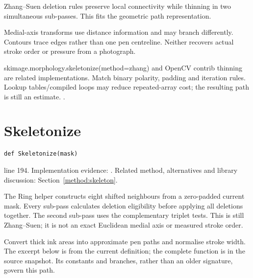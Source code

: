 Zhang--Suen deletion rules preserve local connectivity while thinning in two simultaneous sub-passes. This fits the geometric path representation.


Medial-axis transforms use distance information and may branch differently. Contours trace edges rather than one pen centreline. Neither recovers actual stroke order or pressure from a photograph.


skimage.morphology.skeletonize(method=zhang) and OpenCV contrib thinning are related implementations. Match binary polarity, padding and iteration rules. Lookup tables/compiled loops may reduce repeated-array cost; the resulting path is still an estimate. \cite{zhangsuen1984,skmorph}.


\section{Skeletonize}\label{fn:segment:Skeletonize}
\begin{lstlisting}[style=sig]
def Skeletonize(mask)
\end{lstlisting}
 line 194. Implementation evidence: \cite{code2026}. Related method, alternatives and library discussion: Section~\ref{method:skeleton}.


The Ring helper constructs eight shifted neighbours from a zero-padded current mask. Every sub-pass calculates deletion eligibility before applying all deletions together. The second sub-pass uses the complementary triplet tests. This is still Zhang--Suen; it is not an exact Euclidean medial axis or measured stroke order.


Convert thick ink areas into approximate pen paths and normalise stroke width. The excerpt below is from the current definition; the complete function is in the source snapshot. Its constants and branches, rather than an older signature, govern this path.


